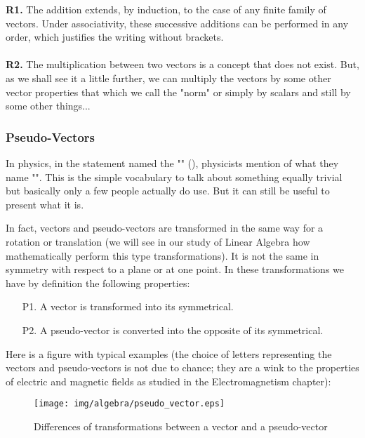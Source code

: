 	\begin{tcolorbox}[title=Remarks,colframe=black,arc=10pt]
\textbf{R1.} The addition extends, by induction, to the case of any finite family of vectors. Under associativity, these successive additions can be performed in any order, which justifies the writing without brackets.\\\\
\textbf{R2.} The multiplication between two vectors is a concept that does not exist. But, as we shall see it a little further, we can multiply the vectors by some other vector properties that which we call the "norm" or simply by scalars and still by some other things...
	\end{tcolorbox}	

\subsubsection{Pseudo-Vectors}

In physics, in the statement named the "" (), physicists mention of what they name "". This is the simple vocabulary to talk about something equally trivial but basically only a few people actually do use. But it can still be useful to present what it is.

In fact, vectors and pseudo-vectors are transformed in the same way for a rotation or translation (we will see in our study of Linear Algebra how mathematically perform this type transformations). It is not the same in symmetry with respect to a plane or at one point. In these transformations we have by definition the following properties:
	\begin{enumerate}
		\item[P1.] A vector is transformed into its symmetrical.
		\item[P2.] A pseudo-vector is converted into the opposite of its symmetrical.
	\end{enumerate}
Here is a figure with typical examples (the choice of letters representing the vectors and pseudo-vectors is not due to chance; they are a wink to the properties of electric and magnetic fields as studied in the Electromagnetism chapter):
\begin{figure}[H]
\centering
\texttt{[image: img/algebra/pseudo\_vector.eps]}
\caption{Differences of transformations between a vector and a pseudo-vector}
\end{figure}

